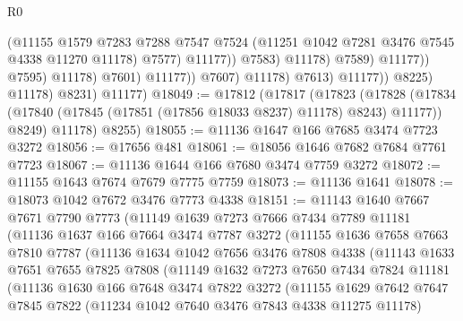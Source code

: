 \begin{lexlean}{R0}
\begin{coremodule}
                                              (@11155
                                                @1579
                                                @7283
                                                @7288
                                                @7547
                                                @7524
                                                (@11251 @1042 @7281 @3476 @7545 @4338 @11270 @11178)
                                                @7577)
                                              @11177))
                                          @7583)
                                        @11178)
                                      @7589)
                                    @11177))
                                @7595)
                              @11178)
                            @7601)
                          @11177))
                      @7607)
                    @11178)
                  @7613)
                @11177))
            @8225)
          @11178)
        @8231)
      @11177)
@18049 := @17812
    (@17817
      (@17823
        (@17828 (@17834 (@17840 (@17845 (@17851 (@17856 @18033 @8237) @11178) @8243) @11177)) @8249)
        @11178)
      @8255)
@18055 := @11136 @1647 @166 @7685 @3474 @7723 @3272
@18056 := @17656 @481
@18061 := @18056 @1646 @7682 @7684 @7761 @7723
@18067 := @11136 @1644 @166 @7680 @3474 @7759 @3272
@18072 := @11155 @1643 @7674 @7679 @7775 @7759
@18073 := @11136 @1641
@18078 := @18073 @1042 @7672 @3476 @7773 @4338
@18151 := @11143
    @1640
    @7667
    @7671
    @7790
    @7773
    (@11149
      @1639
      @7273
      @7666
      @7434
      @7789
      @11181
      (@11136
        @1637
        @166
        @7664
        @3474
        @7787
        @3272
        (@11155
          @1636
          @7658
          @7663
          @7810
          @7787
          (@11136
            @1634
            @1042
            @7656
            @3476
            @7808
            @4338
            (@11143
              @1633
              @7651
              @7655
              @7825
              @7808
              (@11149
                @1632
                @7273
                @7650
                @7434
                @7824
                @11181
                (@11136
                  @1630
                  @166
                  @7648
                  @3474
                  @7822
                  @3272
                  (@11155
                    @1629
                    @7642
                    @7647
                    @7845
                    @7822
                    (@11234 @1042 @7640 @3476 @7843 @4338 @11275 @11178)

\end{coremodule}
\end{lexlean}
